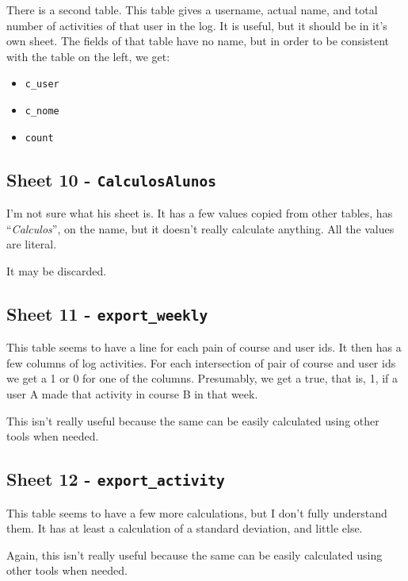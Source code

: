 There is a second table. This table gives a username, actual name, and total
number of activities of that user in the log. It is useful, but it should be in
it's own sheet. The fields of that table have no name, but in order to be
consistent with the table on the left, we get:

\begin{itemize}
    \item \texttt{c\_user}
    \item \texttt{c\_nome}
    \item \texttt{count}
\end{itemize}

\subsection{Sheet 10 - \texttt{CalculosAlunos}}

I'm not sure what his sheet is. It has a few values copied from other tables,
has ``\textit{Calculos}'', on the name, but it doesn't really calculate
anything. All the values are literal.

It may be discarded.

\subsection{Sheet 11 - \texttt{export\_weekly}}

This table seems to have a line for each pain of course and user ids. It then
has a few columns of log activities. For each intersection of pair of course
and user ids we get a 1 or 0 for one of the columns. Presumably, we get a true,
that is, 1, if a user A made that activity in course B in that week.

This isn't really useful because the same can be easily calculated using other
tools when needed.

\subsection{Sheet 12 - \texttt{export\_activity}}

This table seems to have a few more calculations, but I don't fully understand
them. It has at least a calculation of a standard deviation, and little else.

Again, this isn't really useful because the same can be easily calculated using
other tools when needed.

